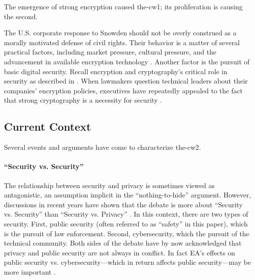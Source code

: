 The emergence of strong encryption caused \ac{the-cw1}; its proliferation is causing the second.

The U.S. corporate response to Snowden should not be overly construed as a morally motivated defense of civil rights.
Their behavior is a matter of several practical factors, including market pressure, cultural pressure, and the
advancement in available encryption technology \cite{treguer_us_2018}. Another factor is the pursuit of basic digital
security. Recall encryption and cryptography's critical role in security as described in . When
lawmakers question technical leaders about their companies' encryption policies, executives have repeatedly appealed to
the fact that strong cryptography is a necessity for security \cite{schulze_clipper_2017}.

\subsection{Current Context}
\label{sec-history-current}

Several events and arguments have come to characterize \ac{the-cw2}.

\paragraph*{``Security vs. Security''} The relationship between security and privacy is sometimes viewed as
antagonistic, an assumption implicit in the ``nothing-to-hide'' argument. However, discussions in recent years have
shown that the debate is more about ``Security vs. Security'' than ``Security vs. Privacy''
\cite{stalla_bourdillon_privacy_2014}. In this context, there are two types of security. First, public security (often
referred to as ``safety'' in this paper), which is the pursuit of law enforcement. Second, cybersecurity, which the
pursuit of the technical community. Both sides of the debate have by now acknowledged that privacy and public security
are not always in conflict. In fact \ac{EA}'s effects on public security vs. cybersecurity---which in return affects
public security---may be more important \cite{schneier_2019}.

